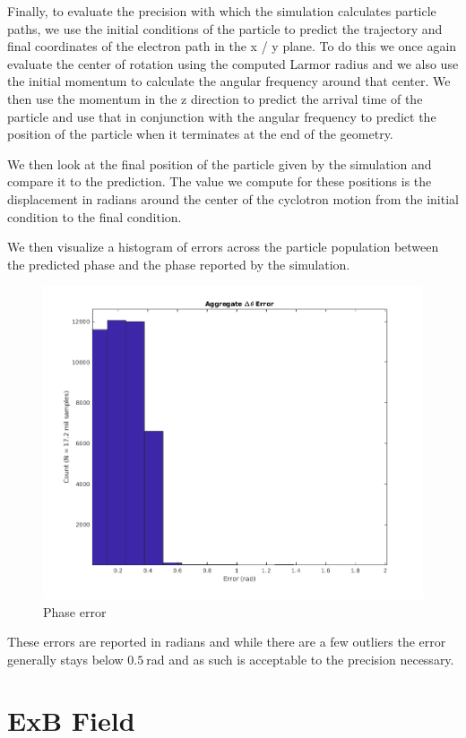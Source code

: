 \documentclass[12pt,letterpaper]{article}
\begin{document}
Finally, to evaluate the precision with which the simulation calculates particle paths, we use the initial conditions of the particle to predict the trajectory and final coordinates of the electron path in the x / y plane. To do this we once again evaluate the center of rotation using the computed Larmor radius and we also use the initial momentum to calculate the angular frequency around that center. We then use the momentum in the z direction to predict the arrival time of the particle and use that in conjunction with the angular frequency to predict the position of the particle when it terminates at the end of the geometry. 

We then look at the final position of the particle given by the simulation and compare it to the prediction. The value we compute for these positions is the displacement in radians around the center of the cyclotron motion from the initial condition to the final condition. 

We then visualize a histogram of errors across the particle population between the predicted phase and the phase reported by the simulation.

    \begin{figure}[H]
    \centering
    \includegraphics[width=0.7\linewidth]{img/phase.png}
    \caption{Phase error}
    \end{figure}
    
These errors are reported in radians and while there are a few outliers the error generally stays below $0.5~$rad and as such is acceptable to the precision necessary.

\section{ExB Field}
\end{document}
